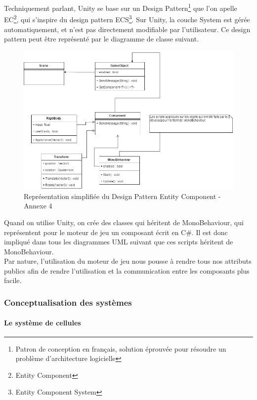 \documentclass[a4paper]{article}
\begin{document}
    Techniquement parlant, Unity se base sur un Design Pattern\footnote{Patron de conception en français, solution éprouvée pour résoudre un problème d'architecture logicielle} que l'on apelle EC\footnote{Entity Component}, qui s'inspire du design pattern ECS\footnote{Entity Component System}. Sur Unity, la couche System est gérée automatiquement, et n'est pas directement modifiable par l'utilisateur. Ce design pattern peut être représenté par le diagramme de classe suivant. \\

    \begin{figure}[H]
        \centering
        \includegraphics[scale=0.45]{img/DiagClasseEntityComponent}
        \caption{Représentation simplifiée du Design Pattern Entity Component - Annexe 4}
    \end{figure} 

    Quand on utilise Unity, on crée des classes qui héritent de MonoBehaviour, qui représentent pour le moteur de jeu un composant écrit en C\#. Il est donc impliqué dans tous les diagrammes UML suivant que ces scripts héritent de MonoBehaviour. \\

    Par nature, l'utilisation du moteur de jeu nous pousse à rendre tous nos attributs publics afin de rendre l'utilisation et la communication entre les composants plus facile. \\

    \subsubsection{Conceptualisation des systèmes}

    \paragraph{Le système de cellules}
\end{document}
